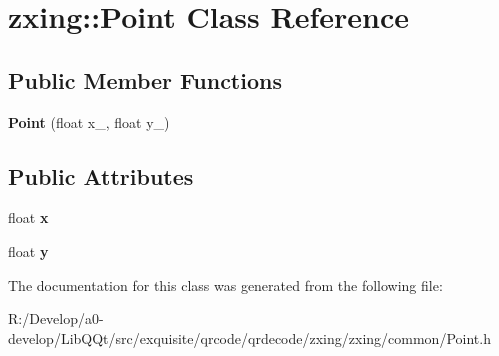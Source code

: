 \hypertarget{classzxing_1_1_point}{}\section{zxing\+:\+:Point Class Reference}
\label{classzxing_1_1_point}
\subsection*{Public Member Functions}
\begin{DoxyCompactItemize}
\item 
\mbox{\label{classzxing_1_1_point_ad4a0d32c01a2ccf27971276af5b7b9ad}} 
{\bfseries Point} (float x\+\_\+, float y\+\_\+)
\end{DoxyCompactItemize}
\subsection*{Public Attributes}
\begin{DoxyCompactItemize}
\item 
\mbox{\label{classzxing_1_1_point_abd48a6f87bf0cf1db20198a7e3f8f04c}} 
float {\bfseries x}
\item 
\mbox{\label{classzxing_1_1_point_af539d7e1797f26d9be68035a8857c0a9}} 
float {\bfseries y}
\end{DoxyCompactItemize}


The documentation for this class was generated from the following file\+:\begin{DoxyCompactItemize}
\item 
R\+:/\+Develop/a0-\/develop/\+Lib\+Q\+Qt/src/exquisite/qrcode/qrdecode/zxing/zxing/common/Point.\+h\end{DoxyCompactItemize}
